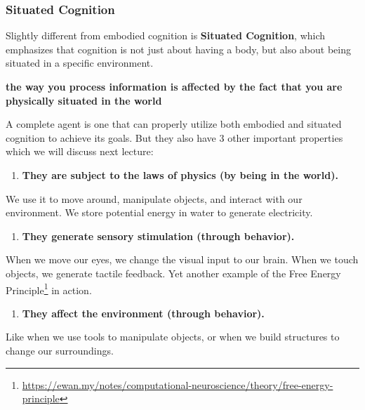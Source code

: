 \documentclass[11pt,a4paper]{article}
\begin{document}
\subsubsection{Situated Cognition}

Slightly different from embodied cognition is \textbf{Situated Cognition}, which emphasizes that cognition is not just about having a body, but also about being situated in a specific environment.

\begin{abstractbox}
\textbf{the way you process information is affected by the fact that you are physically situated in the world}
\end{abstractbox}

\hrulefill

A complete agent is one that can properly utilize both embodied and situated cognition to achieve its goals. But they also have 3 other important properties which we will discuss next lecture:

\begin{enumerate}
  \item \textbf{They are subject to the laws of physics (by being in the world).}
\end{enumerate}

\begin{examplebox}
We use it to move around, manipulate objects, and interact with our environment. We store potential energy in water to generate electricity.
\end{examplebox}

\begin{enumerate}
  \item \textbf{They generate sensory stimulation (through behavior).}
\end{enumerate}

\begin{examplebox}
When we move our eyes, we change the visual input to our brain. When we touch objects, we generate tactile feedback. Yet another example of the Free Energy Principle\footnote{\url{https://ewan.my/notes/computational-neuroscience/theory/free-energy-principle}} in action.
\end{examplebox}

\begin{enumerate}
  \item \textbf{They affect the environment (through behavior).}
\end{enumerate}

\begin{examplebox}
Like when we use tools to manipulate objects, or when we build structures to change our surroundings.
\end{examplebox}



\printbibliography
\end{document}
